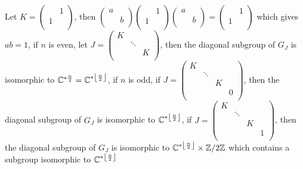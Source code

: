 \documentclass[main]{subfiles}
\begin{document}
Let $K=\left( {\begin{array}{cc}
    & 1 \\
   1 &  \\
  \end{array} } \right)$, then $\left( {\begin{array}{cc}
   a &  \\
    & b \\
  \end{array} } \right)\left( {\begin{array}{cc}
    & 1 \\
   1 &  \\
  \end{array} } \right)\left( {\begin{array}{cc}
   a &  \\
    & b \\
  \end{array} } \right)=\left( {\begin{array}{cc}
    & 1 \\
   1 &  \\
  \end{array} } \right)$ which gives $ab=1$, if $n$ is even, let $J=\left( {\begin{array}{ccc}
   K & & \\
    &\ddots & \\
     & & K\\
  \end{array} } \right)$, then the diagonal subgroup of $G_J$ is isomorphic to $\mathbb{C}^{*\frac{n}{2}}=\mathbb{C}^{*\left\lfloor \frac{n}{2} \right\rfloor}$, if $n$ is odd, if $J=\left( {\begin{array}{cccc}
   K & & & \\
    &\ddots & & \\
     & & K &\\
     & &  &0\\
  \end{array} } \right)$, then the diagonal subgroup of $G_J$ is isomorphic to $\mathbb{C}^{*\left\lfloor \frac{n}{2} \right\rfloor}$, if $J=\left( {\begin{array}{cccc}
   K & & & \\
    &\ddots & & \\
     & & K &\\
     & &  &1\\
  \end{array} } \right)$, then the diagonal subgroup of $G_J$ is isomorphic to $\mathbb{C}^{*\left\lfloor \frac{n}{2} \right\rfloor}\times\mathbb{Z}/2\mathbb{Z}$ which contains a subgroup isomorphic to $\mathbb{C}^{*\left\lfloor \frac{n}{2} \right\rfloor}$ \par
\end{document}
